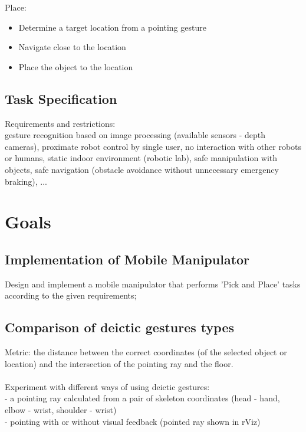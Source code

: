 Place:\\
\begin{itemize}
\item {Determine a target location from a pointing gesture}
\item {Navigate close to the location}
\item {Place the object to the location}
\end{itemize}

\subsection{Task Specification}
Requirements and restrictions:\\
gesture recognition based on image processing (available sensors - depth cameras), proximate robot control by single user, no interaction with other robots or humans, static indoor environment (robotic lab), safe manipulation with objects, safe navigation (obstacle avoidance without unnecessary emergency braking), ...

\section{Goals}
\subsection{Implementation of Mobile Manipulator}
Design and implement a mobile manipulator that performs 'Pick and Place' tasks according to the given requirements;
\subsection{Comparison of deictic gestures types}
Metric: the distance between the correct coordinates (of the selected object or location) and the intersection of the pointing ray and the floor.\\ \\
Experiment with different ways of using deictic gestures:\\
- a pointing ray calculated from a pair of skeleton coordinates (head - hand, elbow - wrist, shoulder - wrist)\\
- pointing with or without visual feedback (pointed ray shown in rViz)\\


